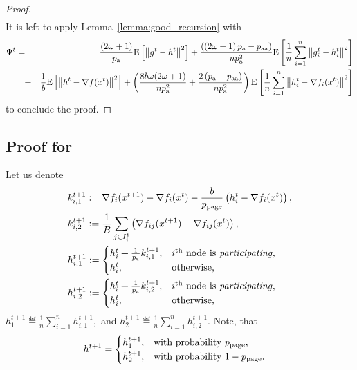 \documentclass{article}
\newcommand{\algorithmname}{DARIA}
\newcommand*{\probavailable}{\ensuremath{p_{\textnormal{a}}}}
\newcommand*{\probpairaa}{\ensuremath{p_{\textnormal{aa}}}}
\newcommand*{\probpage}{\ensuremath{p_{\text{page}}}}
\begin{document}
\begin{proof}
\begin{align*}
    \end{align*}
    It is left to apply Lemma~\ref{lemma:good_recursion} with 
    \begin{eqnarray*}
      \Psi^t &=& \frac{(2 \omega + 1)}{\probavailable} \Exp{\norm{g^{t} - h^{t}}^2} + \frac{(\left(2 \omega + 1\right)\probavailable - \probpairaa)}{n \probavailable^2} \Exp{\frac{1}{n}\sum_{i=1}^n\norm{g^{t}_i - h^{t}_i}^2} \\
        &\quad +& \frac{1}{b} \Exp{\norm{h^{t} - \nabla f(x^{t})}^2} + \left(\frac{8 b \omega (2 \omega + 1)}{n \probavailable^2} + \frac{2 \left(\probavailable - \probpairaa\right)}{n \probavailable^2}\right)\Exp{\frac{1}{n}\sum_{i=1}^n\norm{h^{t}_i - \nabla f_i(x^{t})}^2}
    \end{eqnarray*}
    to conclude the proof.
\end{proof}

\subsection{Proof for \algname{\algorithmname-PAGE}}

Let us denote
\begin{align*}
    &k^{t+1}_{i, 1} \eqdef \nabla f_i(x^{t+1}) - \nabla f_i(x^{t}) - \frac{b}{\probpage} \left(h^t_i - \nabla f_i(x^{t})\right), \\
    &k^{t+1}_{i, 2} \eqdef \frac{1}{B}\sum_{j \in I^t_i}\left(\nabla f_{ij}(x^{t+1}) - \nabla f_{ij}(x^{t})\right), \\
    &h^{t+1}_{i,1} \eqdef \begin{cases}
        h^t_i + \frac{1}{\probavailable} k^{t+1}_{i, 1},& i^{\textnormal{th}} \textnormal{ node is \textit{participating}}, \\
        h^t_i, & \textnormal{otherwise,} 
    \end{cases}  \\
    &h^{t+1}_{i,2} \eqdef \begin{cases}
        h^t_i + \frac{1}{\probavailable} k^{t+1}_{i, 2},& i^{\textnormal{th}} \textnormal{ node is \textit{participating}}, \\
        h^t_i, & \textnormal{otherwise,}
    \end{cases}  \\
\end{align*}
$h^{t+1}_{1} \eqdef \frac{1}{n}\sum_{i=1}^n h^{t+1}_{i,1},$ and $h^{t+1}_{2} \eqdef \frac{1}{n}\sum_{i=1}^n h^{t+1}_{i,2}.$ Note, that
\begin{align*}
  &h^{t+1} = \begin{cases}
    h^{t+1}_{1},& \textnormal{with probability $\probpage$,} \\
    h^{t+1}_{2},& \textnormal{with probability $1 - \probpage$.} 
  \end{cases}
\end{align*}
\end{document}
